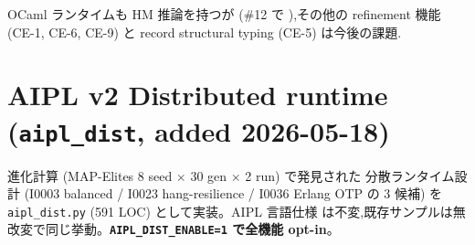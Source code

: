 \documentclass[10pt,a4paper,landscape]{article}
\newcommand{\Yes}{\textcolor{green!50!black}{\textbf{\checkmark}}}
\begin{document}
OCaml ランタイムも HM 推論を持つが (\#12 で \Yes),その他の refinement
機能 (CE-1, CE-6, CE-9) と record structural typing (CE-5) は今後の課題.

\clearpage

\section*{AIPL v2 Distributed runtime (\texttt{aipl\_dist}, added 2026-05-18)}

進化計算 (MAP-Elites 8 seed $\times$ 30 gen $\times$ 2 run) で発見された
分散ランタイム設計 (I0003 balanced / I0023 hang-resilience / I0036 Erlang
OTP の 3 候補) を \texttt{aipl\_dist.py} (591 LOC) として実装。AIPL 言語仕様
は不変,既存サンプルは無改変で同じ挙動。\textbf{\texttt{AIPL\_DIST\_ENABLE=1}
で全機能 opt-in}。
\end{document}
